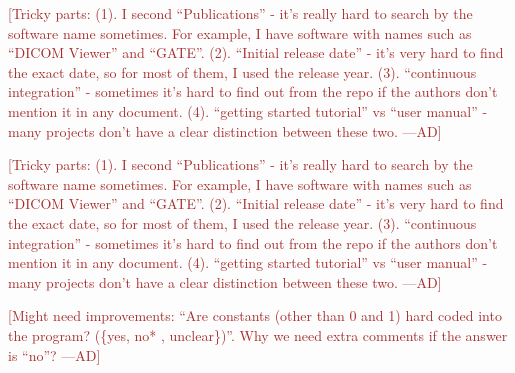 \documentclass[letterpaper,cleveref]{lipics-v2019}
\newcommand{\authornote}[3]{\textcolor{#1}{[#3 ---#2]}}
\newcommand{\authornote}[3]{}
\newcommand{\ad}[1]{\authornote{brown}{AD}{#1}} %
\theoremstyle{definition}
\begin{document}
\ad{Tricky parts: (1). I second ``Publications'' - it's really hard to search by
the software name sometimes. For example, I have software with names such as
``DICOM Viewer'' and ``GATE''. (2). ``Initial release date'' - it's very hard to
find the exact date, so for most of them, I used the release year. (3).
``continuous integration'' - sometimes it's hard to find out from the repo if
the authors don't mention it in any document. (4). ``getting started tutorial''
vs ``user manual'' - many projects don't have a clear distinction between these
two.}

\ad{Tricky parts: (1). I second ``Publications'' - it's really hard to search by
the software name sometimes. For example, I have software with names such as
``DICOM Viewer'' and ``GATE''. (2). ``Initial release date'' - it's very hard to
find the exact date, so for most of them, I used the release year. (3).
``continuous integration'' - sometimes it's hard to find out from the repo if
the authors don't mention it in any document. (4). ``getting started tutorial''
vs ``user manual'' - many projects don't have a clear distinction between these
two.}

\ad{Might need improvements: ``Are constants (other than 0 and 1) hard coded
into the program? (\{yes, no* , unclear\})''. Why we need extra comments if the
answer is ``no''?}
\end{document}
